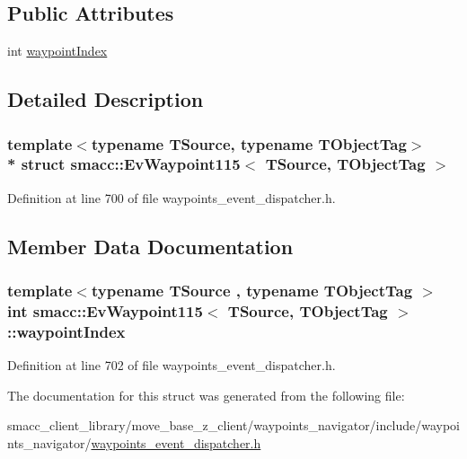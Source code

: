 \subsection*{Public Attributes}
\begin{DoxyCompactItemize}
\item 
int \hyperlink{structsmacc_1_1EvWaypoint115_a429c0d808a64b7325a23e35bc0ceba6c}{waypoint\+Index}
\end{DoxyCompactItemize}


\subsection{Detailed Description}
\subsubsection*{template$<$typename T\+Source, typename T\+Object\+Tag$>$\\*
struct smacc\+::\+Ev\+Waypoint115$<$ T\+Source, T\+Object\+Tag $>$}



Definition at line 700 of file waypoints\+\_\+event\+\_\+dispatcher.\+h.



\subsection{Member Data Documentation}
\subsubsection[{\texorpdfstring{waypoint\+Index}{waypointIndex}}]{\setlength{\rightskip}{0pt plus 5cm}template$<$typename T\+Source , typename T\+Object\+Tag $>$ int {\bf smacc\+::\+Ev\+Waypoint115}$<$ T\+Source, T\+Object\+Tag $>$\+::waypoint\+Index}\hypertarget{structsmacc_1_1EvWaypoint115_a429c0d808a64b7325a23e35bc0ceba6c}{}\label{structsmacc_1_1EvWaypoint115_a429c0d808a64b7325a23e35bc0ceba6c}


Definition at line 702 of file waypoints\+\_\+event\+\_\+dispatcher.\+h.



The documentation for this struct was generated from the following file\+:\begin{DoxyCompactItemize}
\item 
smacc\+\_\+client\+\_\+library/move\+\_\+base\+\_\+z\+\_\+client/waypoints\+\_\+navigator/include/waypoints\+\_\+navigator/\hyperlink{waypoints__event__dispatcher_8h}{waypoints\+\_\+event\+\_\+dispatcher.\+h}\end{DoxyCompactItemize}
